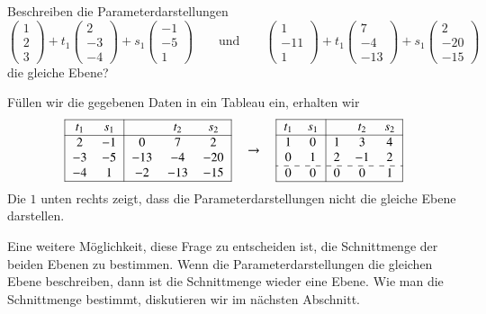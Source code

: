 \begin{beispiel}
Beschreiben die Parameterdarstellungen
\[
\begin{pmatrix}1 \\2 \\ 3\end{pmatrix}
+
t_1\begin{pmatrix}2\\-3\\-4\end{pmatrix}
+
s_1\begin{pmatrix}-1\\-5\\1\end{pmatrix}
\qquad\text{und}\qquad
\begin{pmatrix}1\\-11\\1\end{pmatrix}
+
t_1\begin{pmatrix}7\\-4\\-13\end{pmatrix}
+
s_1\begin{pmatrix}2\\-20\\-15\end{pmatrix}
\]
die gleiche Ebene?
\smallskip

Füllen wir die gegebenen Daten in ein Tableau ein, erhalten wir
\[
\begin{tabular}{| >{$}c<{$} >{$}c<{$}| >{$}c<{$} >{$}c<{$} >{$}c<{$}|}
\hline
t_1&s_1&&t_2&s_2\\
\hline
    2&  -1&   0&   7&   2\\
   -3&  -5& -13&  -4& -20\\
   -4&   1&  -2& -13& -15\\
\hline
\end{tabular}
\quad\rightarrow\quad
\begin{tabular}{| >{$}c<{$} >{$}c<{$}| >{$}c<{$} >{$}c<{$} >{$}c<{$}|}
\hline
t_1&s_1&&t_2&s_2\\
\hline
   1&  0&  1&  3&  4\\
   0&  1&  2& -1&  2\\
\hdashline
   0&  0&  0&  0&  1\\
\hline
\end{tabular}
\]
Die $1$ unten rechts zeigt, dass die Parameterdarstellungen nicht 
die gleiche Ebene darstellen.
\end{beispiel}
Eine weitere Möglichkeit, diese Frage zu entscheiden ist, die Schnittmenge
der beiden Ebenen zu bestimmen.
Wenn die Parameterdarstellungen die gleichen Ebene beschreiben, dann
ist die Schnittmenge wieder eine Ebene.
Wie man die Schnittmenge bestimmt, diskutieren wir im nächsten Abschnitt.

